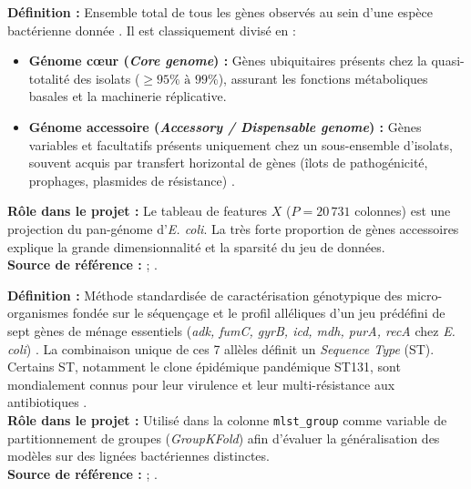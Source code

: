 \documentclass[11pt,a4paper]{article}
\begin{document}
\begin{defbox}
\textbf{Définition :} Ensemble total de tous les gènes observés au sein d'une espèce bactérienne donnée \citep{tettelin2005genome}. Il est classiquement divisé en :
\begin{itemize}[leftmargin=*, label=$\bullet$]
    \item \textbf{Génome cœur (\textit{Core genome}) :} Gènes ubiquitaires présents chez la quasi-totalité des isolats ($\ge 95\% \text{ à } 99\%$), assurant les fonctions métaboliques basales et la machinerie réplicative.
    \item \textbf{Génome accessoire (\textit{Accessory / Dispensable genome}) :} Gènes variables et facultatifs présents uniquement chez un sous-ensemble d'isolats, souvent acquis par transfert horizontal de gènes (îlots de pathogénicité, prophages, plasmides de résistance) \citep{medini2005microbial}.
\end{itemize}
\textbf{Rôle dans le projet :} Le tableau de features $X$ ($P=20\,731$ colonnes) est une projection du pan-génome d'\textit{E. coli}. La très forte proportion de gènes accessoires explique la grande dimensionnalité et la sparsité du jeu de données.\\
\textbf{Source de référence :} \citet{tettelin2005genome} ; \citet{medini2005microbial}.
\end{defbox}

\begin{defbox}
\textbf{Définition :} Méthode standardisée de caractérisation génotypique des micro-organismes fondée sur le séquençage et le profil alléliques d'un jeu prédéfini de sept gènes de ménage essentiels (\textit{adk, fumC, gyrB, icd, mdh, purA, recA} chez \textit{E. coli}) \citep{maiden1998multilocus}. La combinaison unique de ces 7 allèles définit un \textit{Sequence Type} (ST). Certains ST, notamment le clone épidémique pandémique ST131, sont mondialement connus pour leur virulence et leur multi-résistance aux antibiotiques \citep{nicolaschanoine2014ecoli}.\\
\textbf{Rôle dans le projet :} Utilisé dans la colonne \texttt{mlst\_group} comme variable de partitionnement de groupes (\textit{GroupKFold}) afin d'évaluer la généralisation des modèles sur des lignées bactériennes distinctes.\\
\textbf{Source de référence :} \citet{maiden1998multilocus} ; \citet{nicolaschanoine2014ecoli}.
\end{defbox}
\end{document}
